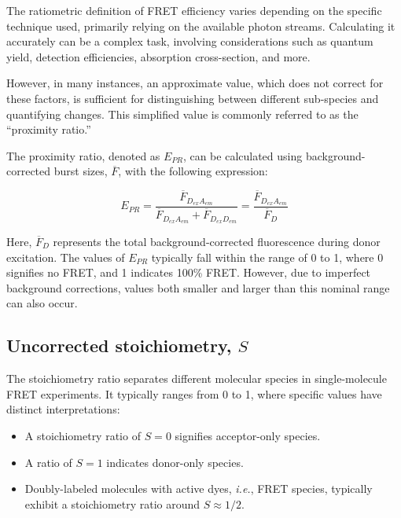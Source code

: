 The ratiometric definition of FRET efficiency varies depending on the specific technique used, primarily relying on the available photon streams. Calculating it accurately can be a complex task, involving considerations such as quantum yield, detection efficiencies, absorption cross-section, and more.

However, in many instances, an approximate value, which does not correct for these factors, is sufficient for distinguishing between different sub-species and quantifying changes. 
This simplified value is commonly referred to as the \enquote{proximity ratio.}

The proximity ratio, denoted as $E_{PR}$, can be calculated using background-corrected burst sizes, $\overline{F}$, with the following expression:

\begin{equation}
\label{eqn:Epr}
E_{PR}=\frac{\overline{F}_{D_{ex}A_{em}}}{\overline{F}_{D_{ex}A_{em}}+\overline{F}_{D_{ex}D_{em}}}=\frac{\overline{F}_{D_{ex}A_{em}}}{\overline{F}_D}
\end{equation}

\noindent
Here, $\overline{F}_D$ represents the total background-corrected fluorescence during donor excitation. 
The values of $E_{PR}$ typically fall within the range of 0 to 1, where 0 signifies no FRET, and 1 indicates 100\% FRET. 
However, due to imperfect background corrections, values both smaller and larger than this nominal range can also occur.

\subsection{Uncorrected stoichiometry, $S$}
\label{sec:uncorrected_S_apdx}

The stoichiometry ratio separates different molecular species in single-molecule FRET experiments. It typically ranges from 0 to 1, where specific values have distinct interpretations:

\begin{itemize}
    \item A stoichiometry ratio of $S = 0$ signifies acceptor-only species.
    \item A ratio of $S = 1$ indicates donor-only species.
    \item Doubly-labeled molecules with active dyes, \textit{i.e.}, FRET species, typically exhibit a stoichiometry ratio around $S \approx 1/2$.
\end{itemize}

